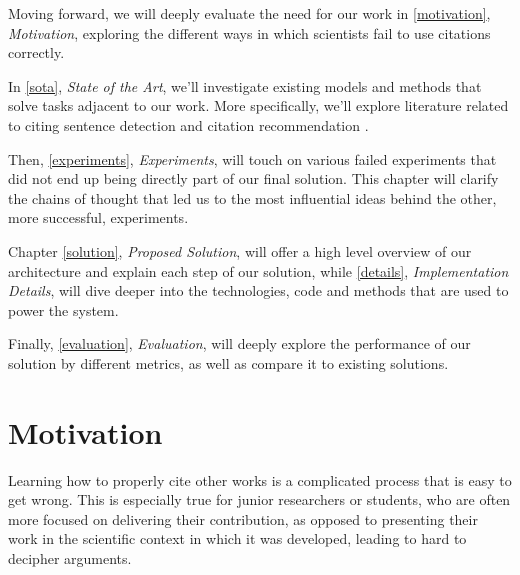 \documentclass[12pt,a4paper]{report}
\begin{document}
Moving forward, we will deeply evaluate the need for our work in \autoref{motivation}, \textit{Motivation}, exploring the different ways in which scientists fail to use citations correctly.

In \autoref{sota}, \textit{State of the Art}, we'll investigate existing models and methods that solve tasks adjacent to our work. More specifically, we'll explore literature related to citing sentence detection \cite{Sugiyama2010IdentifyingCS} and citation recommendation \cite{He2010ContextawareCR}.

Then, \autoref{experiments}, \textit{Experiments}, will touch on various failed experiments that did not end up being directly part of our final solution. This chapter will clarify the chains of thought that led us to the most influential ideas behind the other, more successful, experiments. 

Chapter \ref{solution}, \textit{Proposed Solution}, will offer a high level overview of our architecture and explain each step of our solution, while \autoref{details}, \textit{Implementation Details}, will dive deeper into the technologies, code and methods that are used to power the system.

Finally, \autoref{evaluation}, \textit{Evaluation}, will deeply explore the performance of our solution by different metrics, as well as compare it to existing solutions.

\chapter{Motivation} \label{motivation}



Learning how to properly cite other works is a complicated process that is easy to get wrong. This is especially true for junior researchers or students, who are often more focused on delivering their contribution, as opposed to presenting their work in the scientific context in which it was developed, leading to hard to decipher arguments.
\end{document}
